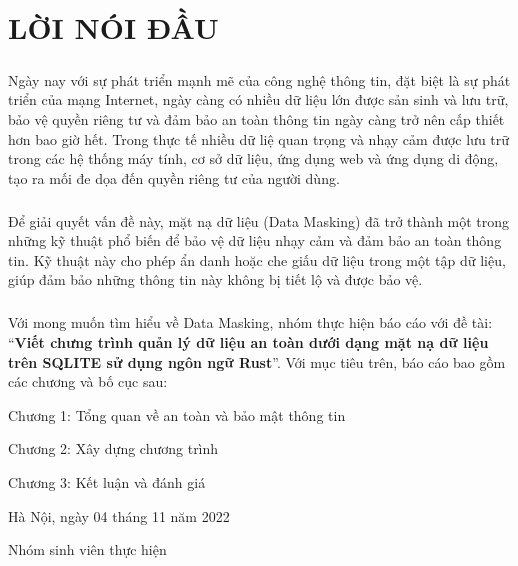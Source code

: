 
\chapter*{LỜI NÓI ĐẦU}
{}

\paragraph{}
Ngày nay với sự phát triển mạnh mẽ của công nghệ thông tin, đặt biệt là sự phát triển của mạng Internet, ngày càng có nhiều dữ liệu lớn được sản sinh và lưu trữ, bảo vệ quyền riêng tư và đảm bảo an toàn thông tin ngày càng trở nên cấp thiết hơn bao giờ hết. Trong thực tế nhiều dữ liệ quan trọng và nhạy cảm được lưu trữ trong các hệ thống máy tính, cơ sở dữ liệu, ứng dụng web và ứng dụng di động, tạo ra mối đe dọa đến quyền riêng tư của người dùng.

\paragraph{}
Để giải quyết vấn đề này, mặt nạ dữ liệu (Data Masking) đã trở thành một trong những kỹ thuật phổ biến để bảo vệ dữ liệu nhạy cảm và đảm bảo an toàn thông tin. Kỹ thuật này cho phép ẩn danh hoặc che giấu dữ liệu  trong một tập dữ liệu, giúp đảm bảo những thông tin này không bị tiết lộ và được bảo vệ. 

\paragraph{}
Với mong muốn tìm hiểu về Data Masking, nhóm thực hiện báo cáo với đề tài: “\textbf{Viết chưng trình quản lý dữ liệu an toàn dưới dạng mặt nạ dữ liệu trên SQLITE sử dụng ngôn ngữ Rust}”. Với mục tiêu trên, báo cáo bao gồm các chương và bố cục sau:

\hspace{1cm}Chương 1: Tổng quan về an toàn và bảo mật thông tin

\hspace{1cm}Chương 2: Xây dựng chương trình

\hspace{1cm}Chương 3: Kết luận và đánh giá

\vspace{0.5cm}

\hspace{6cm}Hà Nội, ngày 04 tháng 11 năm 2022

\vspace{2cm}

\hspace{7cm}Nhóm sinh viên thực hiện

